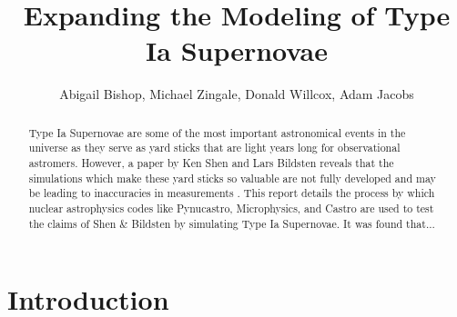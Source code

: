 \documentclass[preprint]{aastex62}
\begin{document}
\title{Expanding the Modeling of Type Ia Supernovae}
\author{Abigail Bishop, Michael Zingale, Donald Willcox, Adam Jacobs}

  

\begin{abstract}
  
  Type Ia Supernovae are some of the most important astronomical events in the universe as they serve as yard sticks that are light years long for observational astromers. However, a paper by Ken Shen and Lars Bildsten reveals that the simulations which make these yard sticks so valuable are not fully developed and may be leading to inaccuracies in measurements \citep{shenNbildsten}. This report details the process by which nuclear astrophysics codes like Pynucastro, Microphysics, and Castro are used to test the claims of Shen \& Bildsten by simulating Type Ia Supernovae. It was found that... %
  

\end{abstract}

\pagebreak

\section{Introduction}

\end{document}
